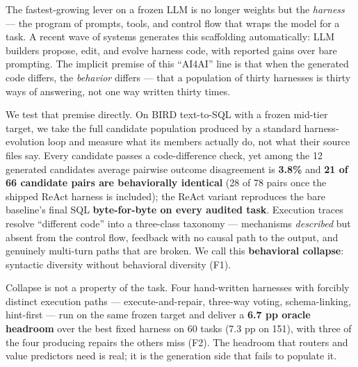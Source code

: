 The fastest-growing lever on a frozen LLM is no longer weights but the
\emph{harness} --- the program of prompts, tools, and control flow that
wraps the model for a task. A recent wave of systems generates this
scaffolding automatically: LLM builders propose, edit, and evolve
harness code, with reported gains over bare prompting. The implicit
premise of this ``AI4AI'' line is that when the generated code differs,
the \emph{behavior} differs --- that a population of thirty harnesses is
thirty ways of answering, not one way written thirty times.

We test that premise directly. On BIRD text-to-SQL with a frozen
mid-tier target, we take the full candidate population produced by a
standard harness-evolution loop and measure what its members actually
do, not what their source files say. Every candidate passes a
code-difference check, yet among the 12 generated candidates average
pairwise outcome disagreement is \textbf{3.8\%} and \textbf{21 of 66
candidate pairs are behaviorally identical} (28 of 78 pairs once the
shipped ReAct harness is included); the ReAct variant reproduces the
bare baseline's final SQL \textbf{byte-for-byte on every audited task}.
Execution traces resolve ``different code'' into a three-class taxonomy
--- mechanisms \emph{described} but absent from the control flow,
feedback with no causal path to the output, and genuinely multi-turn
paths that are broken. We call this \textbf{behavioral collapse}:
syntactic diversity without behavioral diversity (F1).

Collapse is not a property of the task. Four hand-written harnesses with
forcibly distinct execution paths --- execute-and-repair, three-way
voting, schema-linking, hint-first --- run on the same frozen target and
deliver a \textbf{6.7 pp oracle headroom} over the best fixed harness on
60 tasks (7.3 pp on 151), with three of the four producing repairs the
others miss (F2). The headroom that routers and value predictors need is
real; it is the generation side that fails to populate it.

